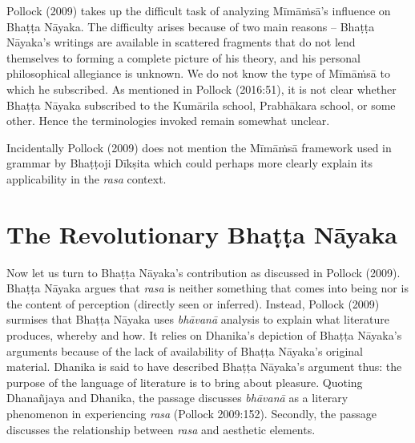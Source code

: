 \newpage

Pollock (2009) takes up the difficult task of analyzing Mīmāṁsā’s influence on Bhaṭṭa Nāyaka. The difficulty arises because of two main reasons -- Bhaṭṭa Nāyaka’s writings are available in scattered fragments that do not lend themselves to forming a complete picture of his theory, and his personal philosophical allegiance is unknown. We do not know the type of Mīmāṁsā to which he subscribed. As mentioned in Pollock (2016:51), it is not clear whether Bhaṭṭa Nāyaka subscribed to the Kumārila school, Prabhākara school, or some other. Hence the terminologies invoked remain somewhat unclear.

 Incidentally Pollock (2009) does not mention the Mīmāṁsā framework used in grammar by Bhaṭṭoji Dīkṣita which could perhaps more clearly explain its applicability in the \textsl{rasa} context.\\[-20pt] 

\section*{The Revolutionary Bhaṭṭa Nāyaka}

Now let us turn to Bhaṭṭa Nāyaka’s contribution as discussed in Pollock (2009). Bhaṭṭa Nāyaka argues that \textsl{rasa} is neither something that comes into being nor is the content of perception (directly seen or inferred). Instead, Pollock (2009) surmises that Bhaṭṭa Nāyaka uses \textsl{bhāvanā} analysis to explain what literature produces, whereby and how. It relies on Dhanika’s depiction of Bhaṭṭa Nāyaka’s arguments because of the lack of availability of Bhaṭṭa Nāyaka’s original material. Dhanika is said to have described Bhaṭṭa Nāyaka’s argument thus: the purpose of the language of literature is to bring about pleasure. Quoting Dhanañjaya and Dhanika, the passage discusses \textsl{bhāvanā} as a literary phenomenon in experiencing \textsl{rasa} (Pollock 2009:152). Secondly, the passage discusses the relationship between \textsl{rasa} and aesthetic elements.

